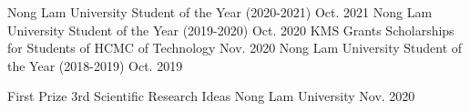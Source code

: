 

\begin{cvhonors}
  \cvhonor
    {Nong Lam University Student of the Year (2020-2021)} %
    {} %
    {Oct. 2021} %
  \cvhonor
    {Nong Lam University Student of the Year (2019-2020)} %
    {} %
    {Oct. 2020} %
  \cvhonor
    {KMS Grants Scholarships for Students of HCMC of Technology} %
    {} %
    {Nov. 2020} %
  \cvhonor
    {Nong Lam University Student of the Year (2018-2019)} %
    {} %
    {Oct. 2019} %
\end{cvhonors}


\begin{cvawards}

  \cvaward
    {First Prize} %
    {3rd Scientific Research Ideas} %
    {Nong Lam University} %
    {Nov. 2020} %
 
\end{cvawards}


